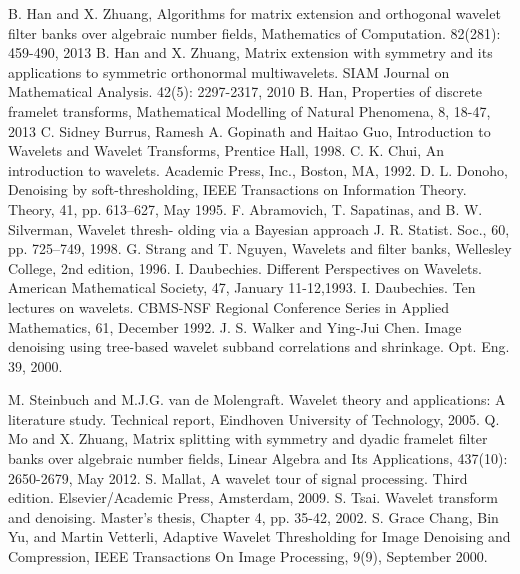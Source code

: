 \documentclass[12pt, a4paper, oneside]{Thesis} %
\begin{document}
\label{Bibliography}




\begin{thebibliography}{99} 
\bibitem {} B. Han and X. Zhuang, Algorithms for matrix extension and orthogonal wavelet filter banks over algebraic number fields, Mathematics of Computation. 82(281): 459-490, 2013
\bibitem {} B. Han and X. Zhuang, Matrix extension with symmetry and its applications to symmetric orthonormal multiwavelets. SIAM Journal on Mathematical Analysis. 42(5): 2297-2317, 2010
\bibitem {} B. Han, Properties of discrete framelet transforms, Mathematical Modelling of Natural Phenomena, 8, 18-47, 2013
\bibitem {} C. Sidney Burrus, Ramesh A. Gopinath and Haitao Guo, Introduction to Wavelets and Wavelet Transforms, Prentice Hall, 1998.
\bibitem {} C. K. Chui, An introduction to wavelets. Academic Press, Inc., Boston, MA, 1992.
\bibitem {} D. L. Donoho, Denoising by soft-thresholding, IEEE Transactions on Information Theory. Theory, 41, pp. 613–627, May 1995.
\bibitem {} F. Abramovich, T. Sapatinas, and B. W. Silverman, Wavelet thresh- olding via a Bayesian approach  J. R. Statist. Soc., 60, pp. 725–749, 1998.
\bibitem {} G. Strang and T. Nguyen, Wavelets and filter banks, Wellesley College, 2nd edition, 1996.
\bibitem {} I. Daubechies. Different Perspectives on Wavelets. American Mathematical Society, 47, January 11-12,1993.
\bibitem {} I. Daubechies. Ten lectures on wavelets. CBMS-NSF Regional Conference Series in Applied Mathematics, 61, December 1992.
\bibitem {} J. S. Walker and Ying-Jui Chen. Image denoising using tree-based wavelet subband correlations and shrinkage. Opt. Eng. 39, 2000.

\bibitem {} M. Steinbuch and M.J.G. van de Molengraft. Wavelet theory and applications: A literature study. Technical report, Eindhoven University of Technology, 2005. 
\bibitem {} Q. Mo and X. Zhuang, Matrix splitting with symmetry and dyadic framelet filter banks over algebraic number fields,  Linear Algebra and Its Applications, 437(10): 2650-2679, May 2012. 
\bibitem {} S. Mallat, A wavelet tour of signal processing. Third edition. Elsevier/Academic Press, Amsterdam, 2009.
\bibitem {} S. Tsai. Wavelet transform and denoising. Master’s thesis, Chapter 4, pp. 35-42, 2002.
\bibitem {} S. Grace Chang, Bin Yu, and Martin Vetterli, Adaptive Wavelet Thresholding for Image Denoising and Compression, IEEE Transactions On Image Processing, 9(9), September 2000.

\end{thebibliography}
\end{document}
